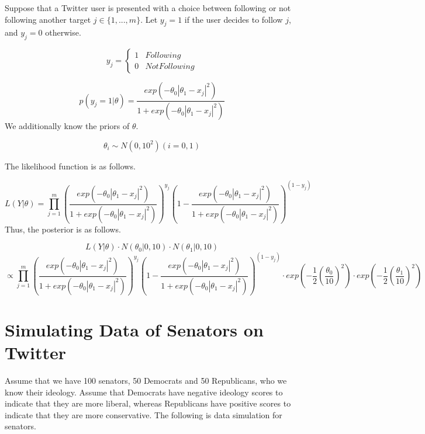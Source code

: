 \documentclass[]{book}
\begin{document}
Suppose that a Twitter user is presented with a choice between following
or not following another target \(j \in \{ 1, ..., m\}\). Let
\(y_{j}=1\) if the user decides to follow \(j\), and \(y_{j}=0\)
otherwise.

\[y_{j}=\begin{cases} 1 & Following \\ 0 & Not Following \end{cases}\]

\[p(y_{j}=1|\theta) = \frac{exp(- \theta_0|\theta_1 - x_j|^2)}{1+exp(- \theta_0|\theta_1 - x_j|^2)}\]
We additionally know the priors of \(\theta\).

\[\theta_i \sim N(0,10^2) (i = 0, 1)\]

The likelihood function is as follows.

\[L(Y|\theta)=\prod_{j=1}^{m} (\frac{exp(- \theta_0|\theta_1 - x_j|^2)}{1+exp(- \theta_0|\theta_1 - x_j|^2)})^{y_j}(1-\frac{exp(- \theta_0|\theta_1 - x_j|^2)}{1+exp(- \theta_0|\theta_1 - x_j|^2)})^{(1-y_j)}\]
Thus, the posterior is as follows.

\[L(Y|\theta) \cdot N(\theta_0|0,10) \cdot N(\theta_1|0,10)\]
\[\propto \prod_{j=1}^{m} (\frac{exp(- \theta_0|\theta_1 - x_j|^2)}{1+exp(- \theta_0|\theta_1 - x_j|^2)})^{y_j}(1-\frac{exp(- \theta_0|\theta_1 - x_j|^2)}{1+exp(- \theta_0|\theta_1 - x_j|^2)})^{(1-y_j)}\cdot exp(-\frac{1}{2}(\frac{\theta_0}{10})^2)\cdot exp(-\frac{1}{2}(\frac{\theta_1}{10})^2)\]

\section{Simulating Data of Senators on
Twitter}\label{simulating-data-of-senators-on-twitter}

Assume that we have 100 senators, 50 Democrats and 50 Republicans, who
we know their ideology. Assume that Democrats have negative ideology
scores to indicate that they are more liberal, whereas Republicans have
positive scores to indicate that they are more conservative. The
following is data simulation for senators.
\end{document}
